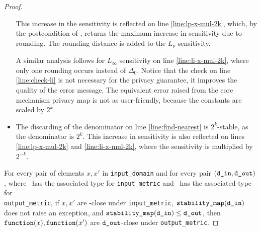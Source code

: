 \documentclass{article}
\begin{document}
\begin{proof}
\begin{itemize}
        This increase in the sensitivity is reflected on line \ref{line:lp-x-mul-2k},
        which, by the postcondition of ,
        returns the maximum increase in sensitivity due to rounding.
        The rounding distance is added to the $L_p$ sensitivity.

        A similar analysis follows for $L_\infty$ sensitivity on line \ref{line:li-x-mul-2k},
        where only one rounding occurs instead of $\Delta_0$.
        Notice that the check on line \ref{line:check-li} is not necessary for the privacy guarantee,
        it improves the quality of the error message.
        The equivalent error raised from the core mechanism privacy map is not as user-friendly,
        because the constants are scaled by $2^k$.

        \item The discarding of the denominator on line \ref{line:find-nearest} is $2^k$-stable,
            as the denominator is $2^k$.
            This increase in sensitivity is also reflected on lines \ref{line:lp-x-mul-2k} and \ref{line:li-x-mul-2k},
            where the sensitivity is multiplied by $2^{-k}$.
    \end{itemize}

    For every pair of elements $x, x'$ in \texttt{input\_domain} and for every pair $(\texttt{d\_in}, \texttt{d\_out})$, 
    where \din\ has the associated type for \texttt{input\_metric} and \dout\ has the associated type for \\ \texttt{output\_metric}, 
    if $x, x'$ are \din-close under \texttt{input\_metric}, $\texttt{stability\_map}(\texttt{d\_in})$ does not raise an exception,
    and $\texttt{stability\_map}(\texttt{d\_in}) \leq \texttt{d\_out}$, 
    then $\texttt{function}(x), \texttt{function}(x')$ are $\texttt{d\_out}$-close under \texttt{output\_metric}.
\end{proof}
\end{document}
